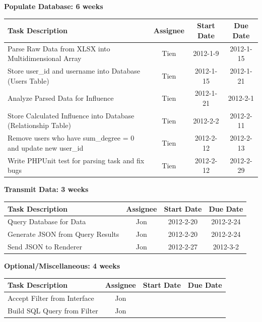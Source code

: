 \documentclass[12pt, letterpaper]{article}
\begin{document}
  \begin{center}
		{\bf Populate Database: 6 weeks}
    \begin{tabular}{| p{8.3cm} || c | c | c | }
      \hline
      Task Description & Assignee & Start Date & Due Date \\
      \hline
	    Parse Raw Data from XLSX into Multidimensional Array & Tien & 2012-1-9 & 2012-1-15 \\
        Store user\_id and username into Database (Users Table) & Tien & 2012-1-15 & 2012-1-21 \\
	    Analyze Parsed Data for Influence & Tien & 2012-1-21 & 2012-2-1 \\
        Store Calculated Influence into Database (Relationship Table) & Tien & 2012-2-2 & 2012-2-11 \\
        Remove users who have sum\_degree = 0 and update new user\_id & Tien & 2012-2-12 & 2012-2-13 \\
		Write PHPUnit test for parsing task and fix bugs & Tien & 2012-2-12 & 2012-2-29 \\
      \hline
    \end{tabular}
  \end{center}

  \begin{center}
		{\bf Transmit Data: 3 weeks}
    \begin{tabular}{| p{8.3cm} || c | c | c | }
      \hline
      Task Description & Assignee & Start Date & Due Date \\
      \hline
	    Query Database for Data & Jon & 2012-2-20 & 2012-2-24 \\
	    Generate JSON from Query Results & Jon & 2012-2-20 & 2012-2-24 \\
	    Send JSON to Renderer & Jon & 2012-2-27 & 2012-3-2 \\
      \hline
    \end{tabular}
  \end{center}
  
  \begin{center}
		{\bf Optional/Miscellaneous: 4 weeks}
    \begin{tabular}{| p{8.3cm} || c | c | c | }
      \hline
      Task Description & Assignee & Start Date & Due Date \\
      \hline
	    Accept Filter from Interface & Jon & & \\
	    Build SQL Query from Filter & Jon & & \\
      \hline
    \end{tabular}
  \end{center}
  
\end{document}
